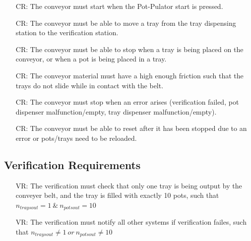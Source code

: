 \documentclass[12pt]{article}
\newcounter{creqnum} %
\newcounter{vreqnum} %
\newcounter{reqnum} %
\begin{document}
  \noindent \begin{itemize}
  
  \item[CR\refstepcounter{creqnum}\thecreqnum \label{R_Conveyor0}:] {The conveyor must
      start when the Pot-Pulator start is pressed.}

  \item[CR\refstepcounter{creqnum}\thecreqnum \label{R_Conveyor1}:] {The conveyor must
      be able to move a tray from the tray dispensing station to the verification station.}
  
  \item[CR\refstepcounter{creqnum}\thecreqnum \label{R_Conveyor2}:] {The conveyor must
      be able to stop when a tray is being placed on the conveyor, or when a pot is being
      placed in a tray.}
      
  \item[CR\refstepcounter{creqnum}\thecreqnum \label{R_Conveyor4}:] {The conveyor material 
      must have a high enough friction such that the trays do not slide while in contact with
      the belt.}
  
  \item[CR\refstepcounter{creqnum}\thecreqnum \label{R_Conveyor5}:] {The conveyor must
      stop when an error arises (verification failed, pot dispenser malfunction/empty, tray dispenser
      malfunction/empty).}
  \item[CR\refstepcounter{creqnum}\thecreqnum \label{R_Conveyor6}:] {The conveyor must
      be able to reset after it has been stopped due to an error or pots/trays need to
      be reloaded.}
  
  \end{itemize}
  
  \subsection{Verification Requirements}
  
  \noindent \begin{itemize}
  
  \item[VR\refstepcounter{vreqnum}\thevreqnum \label{R_Verification1}:] {The verification must
      check that only one tray is being output by the conveyer belt, and the tray is
      filled with exactly 10 pots, such that $n_{traysout}=1\ \&\ n_{potsout}=10$}
  
  \item[VR\refstepcounter{vreqnum}\thevreqnum \label{R_Verification2}:] {The verification must
      notify all other systems if verification failes, such that $n_{traysout}\neq1\ or\ n_{potsout}\neq10$}
  
  \end{itemize}
  
\end{document}
